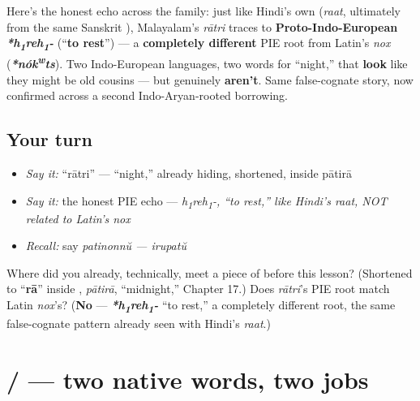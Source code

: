 \begin{culture}
Here's the honest echo across the family: just like Hindi's own \textbf{} (\emph{raat}, ultimately from the same Sanskrit \textbf{}), Malayalam's \emph{rātri} traces to \textbf{Proto-Indo-European} \emph{\textbf{*h\textsubscript{1}reh\textsubscript{1}-}} (\textquotedblleft{}\textbf{to rest}\textquotedblright{}) — a \textbf{completely different} PIE root from Latin's \emph{nox} (\emph{\textbf{*nók\textsuperscript{w}ts}}). Two Indo-European languages, two words for \textquotedblleft{}night,\textquotedblright{} that \textbf{look} like they might be old cousins — but genuinely \textbf{aren't}. Same false-cognate story, now confirmed across a second Indo-Aryan-rooted borrowing.
\end{culture}

\subsection*{Your turn}
\begin{itemize}
\raggedright
  \item \emph{Say it:} \textquotedblleft{}rātri\textquotedblright{} — \textquotedblleft{}night,\textquotedblright{} already hiding, shortened, inside pātirā
  \item \emph{Say it:} the honest PIE echo — \emph{h\textsubscript{1}reh\textsubscript{1}-, \textquotedblleft{}to rest,\textquotedblright{} like Hindi's raat, NOT related to Latin's nox}
  \item \emph{Recall:} say \emph{patinonnŭ — irupatŭ}
\end{itemize}

\begin{tcolorbox}[breakable,colback=teal!4,colframe=teal!35!black,title={Before you move on}]
Where did you already, technically, meet a piece of \textbf{} before this lesson? (Shortened to \textquotedblleft{}\textbf{rā}\textquotedblright{} inside \textbf{}, \emph{pātirā}, \textquotedblleft{}midnight,\textquotedblright{} Chapter 17.) Does \emph{rātri}'s PIE root match Latin \emph{nox}'s? (\textbf{No} — \emph{\textbf{*h\textsubscript{1}reh\textsubscript{1}-}} \textquotedblleft{}to rest,\textquotedblright{} a completely different root, the same false-cognate pattern already seen with Hindi's \emph{raat}.)
\end{tcolorbox}
\section[\texorpdfstring{\ml{ഇരവ്} / \ml{ഇരുൾ} (iravŭ / iruḷ)}{ഇരവ് / ഇരുൾ (iravŭ / iruḷ)}]{ /  — two native words, two jobs}

